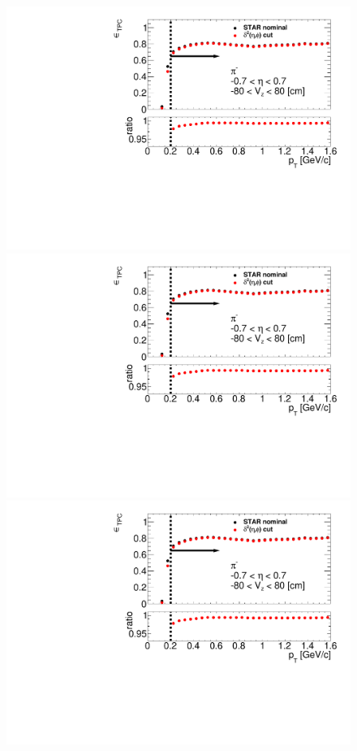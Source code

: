 \begin{figure}[ht]
{	}~
	\parbox{0.48\textwidth}{
		\centering
		\includegraphics[width=\linewidth,page=4]{graphics/eff/tpcEffi.pdf}\\
		\includegraphics[width=\linewidth,page=5]{graphics/eff/tpcEffi.pdf}\\
		\includegraphics[width=\linewidth,page=6]{graphics/eff/tpcEffi.pdf}\\
}
\end{figure}
